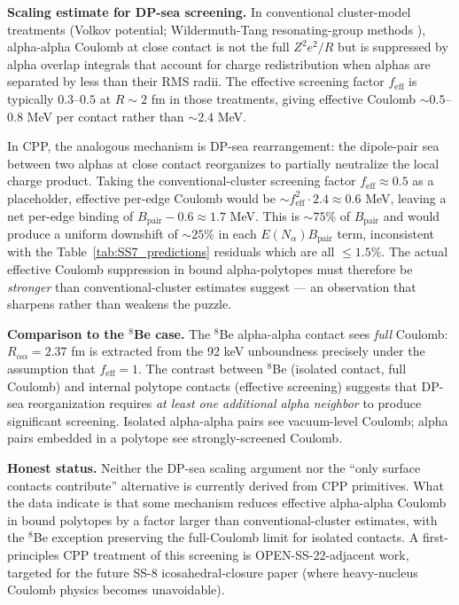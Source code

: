 \documentclass[11pt,letterpaper]{article}
\newcommand{\Bpair}{B_{\mathrm{pair}}}
\newcommand{\Nalpha}{N_{\alpha}}
\newcommand{\Raa}{R_{\alpha\alpha}}
\begin{document}
\textbf{Scaling estimate for DP-sea screening.} In conventional cluster-model treatments (Volkov potential; Wildermuth-Tang resonating-group methods \cite{wildermuth}), alpha-alpha Coulomb at close contact is not the full $Z^2 e^2/R$ but is suppressed by alpha overlap integrals that account for charge redistribution when alphas are separated by less than their RMS radii. The effective screening factor $f_{\mathrm{eff}}$ is typically $0.3$--$0.5$ at $R \sim 2$ fm in those treatments, giving effective Coulomb $\sim 0.5$--$0.8$ MeV per contact rather than $\sim 2.4$ MeV.

In CPP, the analogous mechanism is DP-sea rearrangement: the dipole-pair sea between two alphas at close contact reorganizes to partially neutralize the local charge product. Taking the conventional-cluster screening factor $f_{\mathrm{eff}} \approx 0.5$ as a placeholder, effective per-edge Coulomb would be $\sim f_{\mathrm{eff}}^2 \cdot 2.4 \approx 0.6$ MeV, leaving a net per-edge binding of $\Bpair - 0.6 \approx 1.7$ MeV. This is $\sim 75\%$ of $\Bpair$ and would produce a uniform downshift of $\sim 25\%$ in each $E(\Nalpha) \Bpair$ term, inconsistent with the Table~\ref{tab:SS7_predictions} residuals which are all $\leq 1.5\%$. The actual effective Coulomb suppression in bound alpha-polytopes must therefore be \emph{stronger} than conventional-cluster estimates suggest --- an observation that sharpens rather than weakens the puzzle.

\textbf{Comparison to the ${}^8$Be case.} The ${}^8$Be alpha-alpha contact sees \emph{full} Coulomb: $\Raa = 2.37$ fm is extracted from the 92 keV unboundness precisely under the assumption that $f_{\mathrm{eff}} = 1$. The contrast between ${}^8$Be (isolated contact, full Coulomb) and internal polytope contacts (effective screening) suggests that DP-sea reorganization requires \emph{at least one additional alpha neighbor} to produce significant screening. Isolated alpha-alpha pairs see vacuum-level Coulomb; alpha pairs embedded in a polytope see strongly-screened Coulomb.

\textbf{Honest status.} Neither the DP-sea scaling argument nor the ``only surface contacts contribute'' alternative is currently derived from CPP primitives. What the data indicate is that some mechanism reduces effective alpha-alpha Coulomb in bound polytopes by a factor larger than conventional-cluster estimates, with the ${}^8$Be exception preserving the full-Coulomb limit for isolated contacts. A first-principles CPP treatment of this screening is OPEN-SS-22-adjacent work, targeted for the future SS-8 icosahedral-closure paper (where heavy-nucleus Coulomb physics becomes unavoidable).
\end{document}
